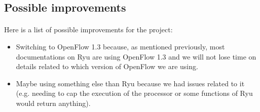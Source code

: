 \documentclass[a4paper, 11pt, oneside]{article}
\begin{document}
\subsection{Possible improvements}
\paragraph{}Here is a list of possible improvements for the project:
\begin{itemize}
\item Switching to OpenFlow 1.3 because, as mentioned previously, most documentations on Ryu are using OpenFlow 1.3 and we will not lose time on details related to which version of OpenFlow we are using.
\item Maybe using something else than Ryu because we had issues related to it (e.g. needing to cap the execution of the processor or some functions of Ryu would return anything).
\end{itemize}

\end{document}
